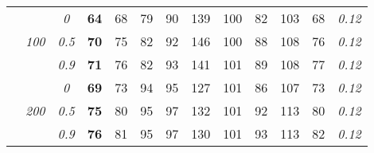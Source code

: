 \begin{table}
\begin{center}
\begin{tabular}{ccc|cc|cc|cc|cc|c|c}
\cline{2-3}\rule{0pt}{3ex}
& & \it  0  & {\bf 64} & 68 & 79 & 90 & 139 & 100 & 82 & 103 & 68 & \it  0.12 \\
 & \it  100  & \it  0.5  & {\bf 70} & 75 & 82 & 92 & 146 & 100 & 88 & 108 & 76 & \it  0.12 \\
& & \it  0.9  & {\bf 71} & 76 & 82 & 93 & 141 & 101 & 89 & 108 & 77 & \it  0.12 \\[1ex]
\cline{2-3}\rule{0pt}{3ex}
& & \it  0  & {\bf 69} & 73 & 94 & 95 & 127 & 101 & 86 & 107 & 73 & \it  0.12 \\
 & \it  200  & \it  0.5  & {\bf 75} & 80 & 95 & 97 & 132 & 101 & 92 & 113 & 80 & \it  0.12 \\
& & \it  0.9  & {\bf 76} & 81 & 95 & 97 & 130 & 101 & 93 & 113 & 82 & \it  0.12 \\
\hline\end{tabular}
\end{center}
\end{table}




